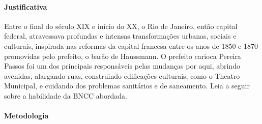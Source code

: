 \documentclass[12pt]{extarticle}
\begin{document}



\paragraph{Justificativa} Entre o final do século \textsc{XIX} e início do \textsc{XX}, o
Rio de Janeiro, então capital federal, atravessava profundas e intensas
transformações urbanas, sociais e culturais, inspirada nas reformas da
capital francesa entre os anos de 1850 e 1870 promovidas pelo prefeito,
o barão de Haussmann. O prefeito carioca Pereira Passos foi um dos
principais responsáveis pelas mudanças por aqui, abrindo avenidas,
alargando ruas, construindo edificações culturais, como o Theatro
Municipal, e cuidando dos problemas sanitários e de saneamento.
Leia a seguir sobre a habilidade da BNCC abordada.










\paragraph{Metodologia} 
\end{document}
